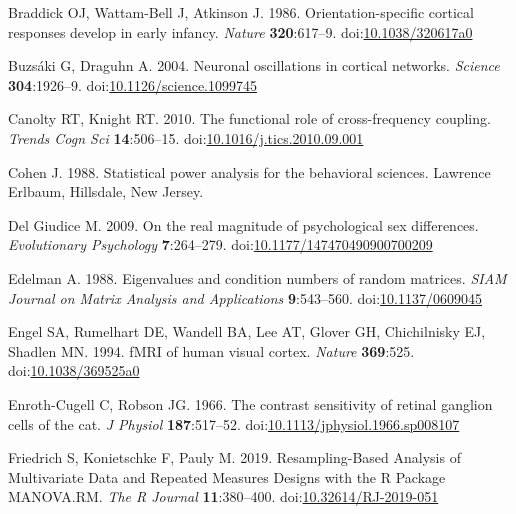 \documentclass[]{article}
\begin{document}
\leavevmode\hypertarget{ref-Braddick1986}{}%
Braddick OJ, Wattam-Bell J, Atkinson J. 1986. Orientation-specific cortical responses develop in early infancy. \emph{Nature} \textbf{320}:617--9. doi:\href{https://doi.org/10.1038/320617a0}{10.1038/320617a0}

\leavevmode\hypertarget{ref-Buzsaki2004}{}%
Buzsáki G, Draguhn A. 2004. Neuronal oscillations in cortical networks. \emph{Science} \textbf{304}:1926--9. doi:\href{https://doi.org/10.1126/science.1099745}{10.1126/science.1099745}

\leavevmode\hypertarget{ref-Canolty2010}{}%
Canolty RT, Knight RT. 2010. The functional role of cross-frequency coupling. \emph{Trends Cogn Sci} \textbf{14}:506--15. doi:\href{https://doi.org/10.1016/j.tics.2010.09.001}{10.1016/j.tics.2010.09.001}

\leavevmode\hypertarget{ref-Cohen1988}{}%
Cohen J. 1988. Statistical power analysis for the behavioral sciences. Lawrence Erlbaum, Hillsdale, New Jersey.

\leavevmode\hypertarget{ref-Giudice2009}{}%
Del Giudice M. 2009. On the real magnitude of psychological sex differences. \emph{Evolutionary Psychology} \textbf{7}:264--279. doi:\href{https://doi.org/10.1177/147470490900700209}{10.1177/147470490900700209}

\leavevmode\hypertarget{ref-Edelman1988}{}%
Edelman A. 1988. Eigenvalues and condition numbers of random matrices. \emph{SIAM Journal on Matrix Analysis and Applications} \textbf{9}:543--560. doi:\href{https://doi.org/10.1137/0609045}{10.1137/0609045}

\leavevmode\hypertarget{ref-Engel1994}{}%
Engel SA, Rumelhart DE, Wandell BA, Lee AT, Glover GH, Chichilnisky EJ, Shadlen MN. 1994. fMRI of human visual cortex. \emph{Nature} \textbf{369}:525. doi:\href{https://doi.org/10.1038/369525a0}{10.1038/369525a0}

\leavevmode\hypertarget{ref-Enroth-Cugell1966}{}%
Enroth-Cugell C, Robson JG. 1966. The contrast sensitivity of retinal ganglion cells of the cat. \emph{J Physiol} \textbf{187}:517--52. doi:\href{https://doi.org/10.1113/jphysiol.1966.sp008107}{10.1113/jphysiol.1966.sp008107}

\leavevmode\hypertarget{ref-Friedrich2019}{}%
Friedrich S, Konietschke F, Pauly M. 2019. Resampling-Based Analysis of Multivariate Data and Repeated Measures Designs with the R Package MANOVA.RM. \emph{The R Journal} \textbf{11}:380--400. doi:\href{https://doi.org/10.32614/RJ-2019-051}{10.32614/RJ-2019-051}
\end{document}
